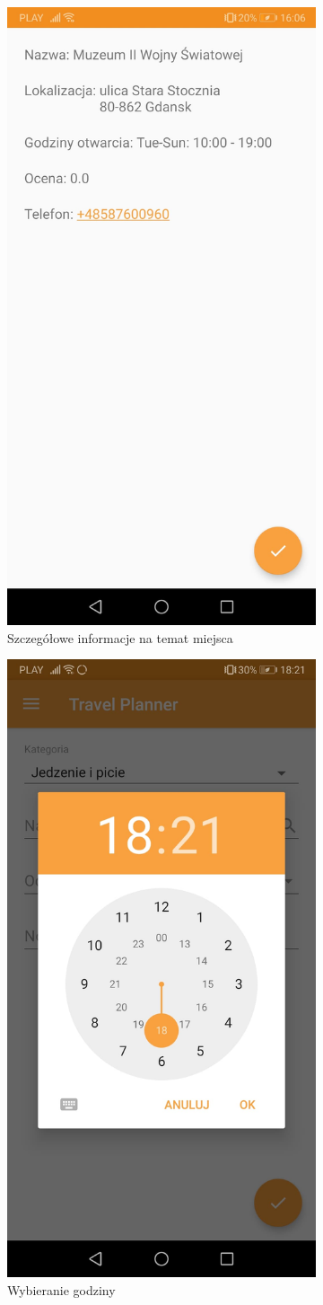 \documentclass[10pt,twoside,a4paper]{report}
\begin{document}
\begin{figure}[h]
\begin{subfigure}{0.3\textwidth}
\includegraphics[width=0.9\linewidth, width=5cm]{placeDescription}
\caption{Szczegółowe informacje na temat miejsca}
\label{fig:placeDescription}
\end{subfigure}
\begin{subfigure}{0.5\textwidth}
\centering
\includegraphics[width=0.9\linewidth, width=5cm]{clock}
\caption{Wybieranie godziny}
\label{fig:clock}
\end{subfigure}
\begin{subfigure}{0.5\textwidth}
\centering

\end{subfigure}
\end{figure}
\end{document}
